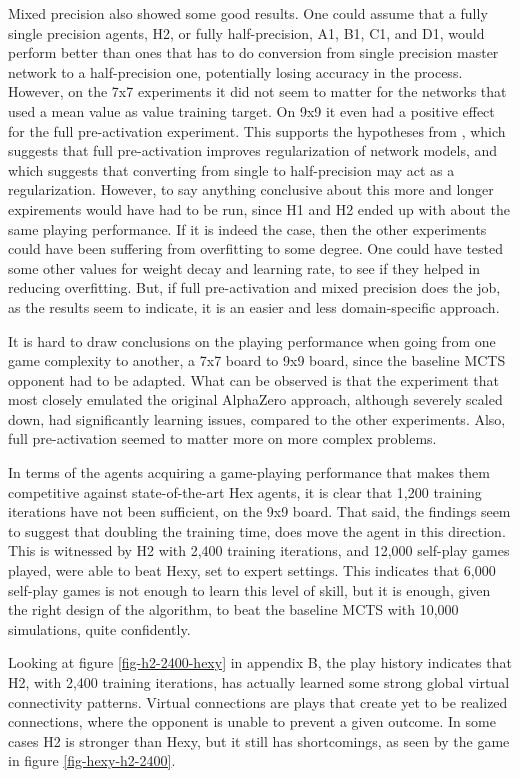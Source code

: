 Mixed precision also showed some good results. One could assume that a fully single precision agents, H2, or fully half-precision, A1, B1, C1, and D1, would perform better than ones that has to do conversion from single precision master network to a half-precision one, potentially losing accuracy in the process. However, on the 7x7 experiments it did not seem to matter for the networks that used a mean value as value training target. On 9x9 it even had a positive effect for the full pre-activation experiment. This supports the hypotheses from \citeauthor{He2016}, which suggests that full pre-activation improves regularization of network models\cite{He2016}, and \citeauthor{Micikevicius2018} which suggests that converting from single to half-precision may act as a regularization\cite{Micikevicius2018}. However, to say anything conclusive about this more and longer expirements would have had to be run, since H1 and H2 ended up with about the same playing performance. If it is indeed the case, then the other experiments could have been suffering from overfitting to some degree. One could have tested some other values for weight decay and learning rate, to see if they helped in reducing overfitting. But, if full pre-activation and mixed precision does the job, as the results seem to indicate, it is an easier and less domain-specific approach.

It is hard to draw conclusions on the playing performance when going from one game complexity to another, a 7x7 board to 9x9 board, since the baseline MCTS opponent had to be adapted. What can be observed is that the experiment that most closely emulated the original AlphaZero approach, although severely scaled down, had significantly learning issues, compared to the other experiments. Also, full pre-activation seemed to matter more on more complex problems.

In terms of the agents acquiring a game-playing performance that makes them competitive against  state-of-the-art Hex agents, it is clear that 1,200 training iterations have not been sufficient, on the 9x9 board. That said, the findings seem to suggest that doubling the training time, does move the agent in this direction. This is witnessed by H2 with 2,400 training iterations, and 12,000 self-play games played, were able to beat Hexy, set to expert settings. This indicates that 6,000 self-play games is not enough to learn this level of skill, but it is enough, given the right design of the algorithm, to beat the baseline MCTS with 10,000 simulations, quite confidently.

Looking at figure \ref{fig-h2-2400-hexy} in appendix B, the play history indicates that H2, with 2,400 training iterations, has actually learned some strong global virtual connectivity patterns. Virtual connections are plays that create yet to be realized connections, where the opponent is unable to prevent a given outcome. In some cases H2 is stronger than Hexy, but it still has shortcomings, as seen by the game in figure \ref{fig-hexy-h2-2400}.